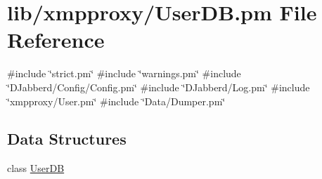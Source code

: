 \hypertarget{_user_d_b_8pm}{
\section{lib/xmpproxy/\-User\-D\-B.pm \-File \-Reference}
\label{_user_d_b_8pm}
}
{\ttfamily \#include \char`\"{}strict.\-pm\char`\"{}}\*
{\ttfamily \#include \char`\"{}warnings.\-pm\char`\"{}}\*
{\ttfamily \#include \char`\"{}\-D\-Jabberd/\-Config/\-Config.\-pm\char`\"{}}\*
{\ttfamily \#include \char`\"{}\-D\-Jabberd/\-Log.\-pm\char`\"{}}\*
{\ttfamily \#include \char`\"{}xmpproxy/\-User.\-pm\char`\"{}}\*
{\ttfamily \#include \char`\"{}\-Data/\-Dumper.\-pm\char`\"{}}\*
\subsection*{\-Data \-Structures}
\begin{DoxyCompactItemize}
\item 
class \hyperlink{classxmpproxy_1_1_user_d_b}{\-User\-D\-B}
\end{DoxyCompactItemize}
